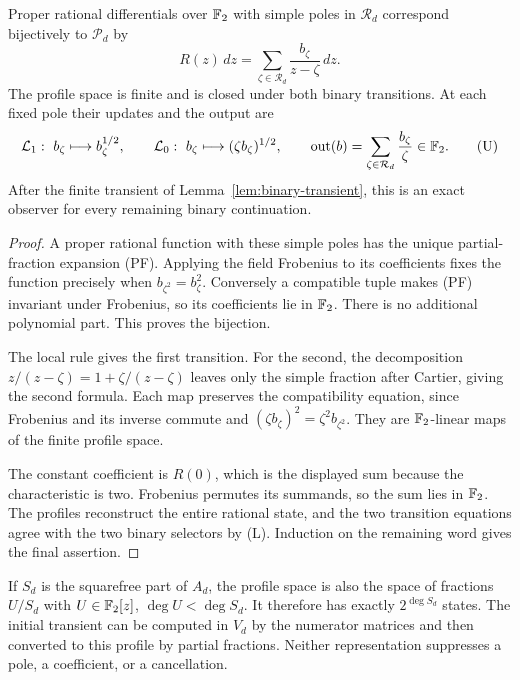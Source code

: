 \begin{theorem}
\label{thm:residue-observer}
Proper rational differentials over $\mathbb F_2$ with simple poles
in $\mathcal R_d$ correspond bijectively to $\mathcal P_d$ by
\[
 R(z)\,dz=\sum_{\zeta\in\mathcal R_d}
                 \frac{b_\zeta}{z-\zeta}\,dz.
 \tag{PF}
\]
The profile space is finite and is closed under both binary
transitions. At each fixed pole their updates and the output are
\[
 \mathcal L_1:\ b_\zeta\longmapsto b_\zeta^{1/2},
 \qquad
 \mathcal L_0:\ b_\zeta\longmapsto(\zeta b_\zeta)^{1/2},
 \qquad
 \operatorname{out}(b)=\sum_{\zeta\in\mathcal R_d}
                             \frac{b_\zeta}{\zeta}\in\Ftwo.
 \tag{U}
\]
After the finite transient of
Lemma~\ref{lem:binary-transient}, this is an exact observer
for every remaining binary continuation.
\end{theorem}
\begin{proof}
A proper rational function with these simple poles has the
unique partial-fraction expansion (PF). Applying the field
Frobenius to its coefficients fixes the function precisely
when $b_{\zeta^2}=b_\zeta^2$. Conversely a compatible tuple
makes (PF) invariant under Frobenius, so its coefficients lie
in $\mathbb F_2$. There is no additional polynomial part.
This proves the bijection.

The local rule gives the first transition. For the second,
the decomposition
$z/(z-\zeta)=1+\zeta/(z-\zeta)$ leaves only the simple
fraction after Cartier, giving the second formula.
Each map preserves the compatibility equation, since
Frobenius and its inverse commute and
$(\zeta b_\zeta)^2=\zeta^2b_{\zeta^2}$.
They are $\mathbb F_2$-linear maps of the finite profile space.

The constant coefficient is $R(0)$, which is the displayed
sum because the characteristic is two. Frobenius permutes
its summands, so the sum lies in $\mathbb F_2$.
The profiles reconstruct the entire rational state, and
the two transition equations agree with the two binary
selectors by (L). Induction on the remaining word gives
the final assertion.
\end{proof}

If $S_d$ is the squarefree part of $A_d$, the profile space
is also the space of fractions $U/S_d$ with
$U\in\mathbb F_2[z]$, $\deg U<\deg S_d$. It therefore has
exactly $2^{\deg S_d}$ states. The initial transient can
be computed in $V_d$ by the numerator matrices and then
converted to this profile by partial fractions. Neither
representation suppresses a pole, a coefficient, or a
cancellation.

